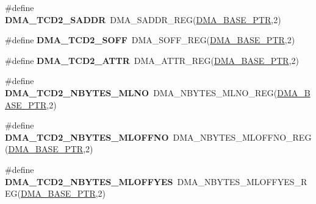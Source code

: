 \begin{DoxyCompactItemize}
\item 
\hypertarget{group___d_m_a___register___accessor___macros_gad1ffbc1cb0292663f36900d4e1c25580}{}\#define {\bfseries D\+M\+A\+\_\+\+T\+C\+D2\+\_\+\+S\+A\+D\+D\+R}~D\+M\+A\+\_\+\+S\+A\+D\+D\+R\+\_\+\+R\+E\+G(\hyperlink{group___d_m_a___peripheral_ga6997fbc1b1973e9f27170217a3bd6f22}{D\+M\+A\+\_\+\+B\+A\+S\+E\+\_\+\+P\+T\+R},2)\label{group___d_m_a___register___accessor___macros_gad1ffbc1cb0292663f36900d4e1c25580}

\item 
\hypertarget{group___d_m_a___register___accessor___macros_ga778e50197a65e123a80815d1870b42b0}{}\#define {\bfseries D\+M\+A\+\_\+\+T\+C\+D2\+\_\+\+S\+O\+F\+F}~D\+M\+A\+\_\+\+S\+O\+F\+F\+\_\+\+R\+E\+G(\hyperlink{group___d_m_a___peripheral_ga6997fbc1b1973e9f27170217a3bd6f22}{D\+M\+A\+\_\+\+B\+A\+S\+E\+\_\+\+P\+T\+R},2)\label{group___d_m_a___register___accessor___macros_ga778e50197a65e123a80815d1870b42b0}

\item 
\hypertarget{group___d_m_a___register___accessor___macros_ga18a70afba86453e8b5e9c89f22a11412}{}\#define {\bfseries D\+M\+A\+\_\+\+T\+C\+D2\+\_\+\+A\+T\+T\+R}~D\+M\+A\+\_\+\+A\+T\+T\+R\+\_\+\+R\+E\+G(\hyperlink{group___d_m_a___peripheral_ga6997fbc1b1973e9f27170217a3bd6f22}{D\+M\+A\+\_\+\+B\+A\+S\+E\+\_\+\+P\+T\+R},2)\label{group___d_m_a___register___accessor___macros_ga18a70afba86453e8b5e9c89f22a11412}

\item 
\hypertarget{group___d_m_a___register___accessor___macros_gaa7eefc1531e30e8f88f39e91f8468244}{}\#define {\bfseries D\+M\+A\+\_\+\+T\+C\+D2\+\_\+\+N\+B\+Y\+T\+E\+S\+\_\+\+M\+L\+N\+O}~D\+M\+A\+\_\+\+N\+B\+Y\+T\+E\+S\+\_\+\+M\+L\+N\+O\+\_\+\+R\+E\+G(\hyperlink{group___d_m_a___peripheral_ga6997fbc1b1973e9f27170217a3bd6f22}{D\+M\+A\+\_\+\+B\+A\+S\+E\+\_\+\+P\+T\+R},2)\label{group___d_m_a___register___accessor___macros_gaa7eefc1531e30e8f88f39e91f8468244}

\item 
\hypertarget{group___d_m_a___register___accessor___macros_ga9a66b7923ef33c03d078edaf888dbe50}{}\#define {\bfseries D\+M\+A\+\_\+\+T\+C\+D2\+\_\+\+N\+B\+Y\+T\+E\+S\+\_\+\+M\+L\+O\+F\+F\+N\+O}~D\+M\+A\+\_\+\+N\+B\+Y\+T\+E\+S\+\_\+\+M\+L\+O\+F\+F\+N\+O\+\_\+\+R\+E\+G(\hyperlink{group___d_m_a___peripheral_ga6997fbc1b1973e9f27170217a3bd6f22}{D\+M\+A\+\_\+\+B\+A\+S\+E\+\_\+\+P\+T\+R},2)\label{group___d_m_a___register___accessor___macros_ga9a66b7923ef33c03d078edaf888dbe50}

\item 
\hypertarget{group___d_m_a___register___accessor___macros_gae2118daf31ada0b80777846e3a4392d4}{}\#define {\bfseries D\+M\+A\+\_\+\+T\+C\+D2\+\_\+\+N\+B\+Y\+T\+E\+S\+\_\+\+M\+L\+O\+F\+F\+Y\+E\+S}~D\+M\+A\+\_\+\+N\+B\+Y\+T\+E\+S\+\_\+\+M\+L\+O\+F\+F\+Y\+E\+S\+\_\+\+R\+E\+G(\hyperlink{group___d_m_a___peripheral_ga6997fbc1b1973e9f27170217a3bd6f22}{D\+M\+A\+\_\+\+B\+A\+S\+E\+\_\+\+P\+T\+R},2)\label{group___d_m_a___register___accessor___macros_gae2118daf31ada0b80777846e3a4392d4}


\end{DoxyCompactItemize}
